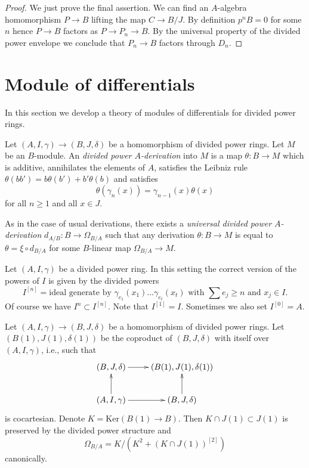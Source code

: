 \begin{proof}
We just prove the final assertion.
We can find an $A$-algebra homomorphism $P \to B$
lifting the map $C \to B/J$. By definition $p^nB = 0$ for
some $n$ hence $P \to B$ factors as $P \to P_n \to B$.
By the universal property of the divided power envelope we
conclude that $P_n \to B$ factors through $D_n$.
\end{proof}







\section{Module of differentials}
\label{section-differentials}

\noindent
In this section we develop a theory of modules of differentials
for divided power rings.

\begin{definition}
\label{definition-derivation}
Let $(A, I, \gamma) \to (B, J, \delta)$ be a homomorphism
of divided power rings. Let $M$ be an $B$-module.
An {\it divided power $A$-derivation} into $M$ is a map
$\theta : B \to M$ which is additive, annihilates the elements
of $A$, satisfies the Leibniz rule
$\theta(bb') = b\theta(b') + b'\theta(b)$ and satisfies
$$
\theta(\gamma_n(x)) = \gamma_{n - 1}(x)\theta(x)
$$
for all $n \geq 1$ and all $x \in J$.
\end{definition}

\noindent
As in the case of usual derivations, there exists a
{\it universal divided power $A$-derivation} $d_{A/B} : B \to \Omega_{B/A}$
such that any derivation $\theta : B \to M$ is equal to
$\theta = \xi \circ d_{B/A}$ for some $B$-linear map $\Omega_{B/A} \to M$.

\medskip\noindent
Let $(A, I, \gamma)$ be a divided power ring. In this setting the
correct version of the powers of $I$ is given by the divided powers
$$
I^{[n]} = \text{ideal generate by }
\gamma_{e_1}(x_1) \ldots \gamma_{e_t}(x_t)
\text{ with }\sum e_j \geq n\text{ and }x_j \in I.
$$
Of course we have $I^n \subset I^{[n]}$. Note that $I^{[1]} = I$.
Sometimes we also set $I^{[0]} = A$.

\begin{lemma}
\label{lemma-diagonal-and-differentials}
Let $(A, I, \gamma) \to (B, J, \delta)$ be a homomorphism
of divided power rings. Let $(B(1), J(1), \delta(1))$ be the coproduct
of $(B, J, \delta)$ with itself over $(A, I, \gamma)$, i.e.,
such that
$$
\xymatrix{
(B, J, \delta) \ar[r] & (B(1), J(1), \delta(1)) \\
(A, I, \gamma) \ar[r] \ar[u] & (B, J, \delta) \ar[u]
}
$$
is cocartesian. Denote $K = \text{Ker}(B(1) \to B)$.
Then $K \cap J(1) \subset J(1)$ is preserved by the divided power
structure and
$$
\Omega_{B/A} = K/ \left(K^2 + (K \cap J(1))^{[2]}\right)
$$
canonically.
\end{lemma}


